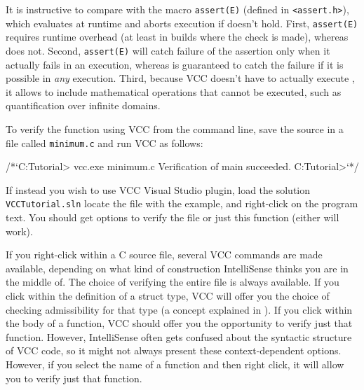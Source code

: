 It is instructive to compare  with the macro
\lstinline|assert(E)| (defined in \lstinline|<assert.h>|), which
evaluates   at runtime and aborts execution if 
doesn't hold. First, \lstinline|assert(E)| requires runtime overhead (at least
in builds where the check is made), whereas  does
not. Second, \lstinline|assert(E)| will catch failure of the 
assertion only when it actually fails in an execution, whereas 
 is guaranteed to catch the failure if it is
possible in \emph{any} execution. Third, because VCC doesn't have to
actually execute , it allows  to include
mathematical operations that cannot be executed, such as
quantification over infinite domains.

To verify the function using VCC from the command line, save the source in a file called \lstinline|minimum.c|
and run VCC as follows:

\begin{VCC}
/*`C:\Somewhere\VCC Tutorial> vcc.exe minimum.c
Verification of main succeeded.
C:\Somewhere\VCC Tutorial>`*/
\end{VCC}


If instead you wish to use VCC Visual Studio plugin, load the solution \lstinline|VCCTutorial.sln|
locate the file with the example, and right-click on the program text.
You should get options to verify the file or just this function (either will work).

\begin{note}
If you right-click within a C source file,
several VCC commands are made available, depending on what kind of
construction IntelliSense thinks you are in the middle of. The choice
of verifying the entire file is always available. If you click within
the definition of a struct type, VCC will offer you the choice of
checking admissibility for that type (a concept explained in ).
If you click within the body of a function, VCC should offer
you the opportunity to verify just that function. However,
IntelliSense often gets confused about the syntactic structure of
VCC code, so it might not always present these context-dependent
options. However, if you select the name of a function and then right
click, it will allow you to verify just that function.
\end{note}

